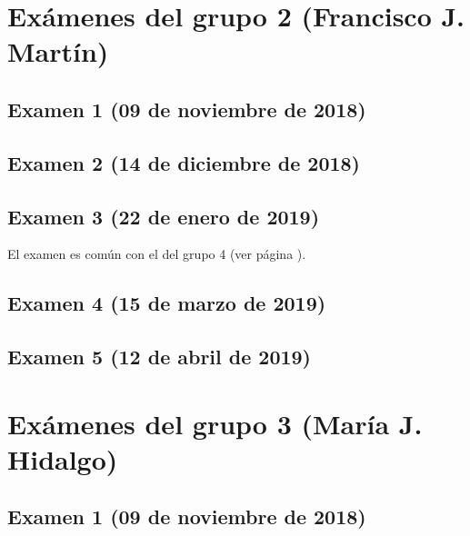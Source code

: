 \documentclass[a4paper,12pt,twoside]{book}
\begin{document}
\section{Exámenes del grupo 2 (Francisco J. Martín)}
\subsection{Examen 1 (09 de noviembre de 2018)}
\subsection{Examen 2 (14 de diciembre de 2018)}
\subsection{Examen 3 (22 de enero de 2019)}
El examen es común con el del grupo 4 (ver página \pageref{examen_18_19_4_3}).
\subsection{Examen 4 (15 de marzo de 2019)}
\subsection{Examen 5 (12 de abril de 2019)}

\section{Exámenes del grupo 3 (María J. Hidalgo)}
\subsection{Examen 1 (09 de noviembre de 2018)}
\end{document}

